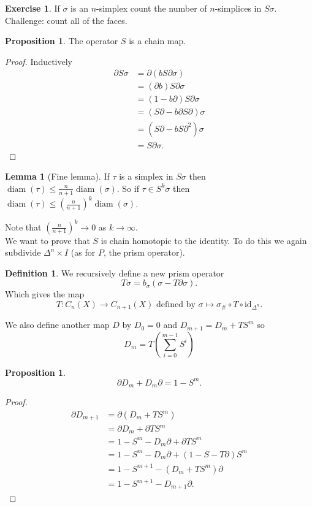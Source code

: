 \documentclass[12pt]{article}
\theoremstyle{definition}
\newtheorem{lem}[thm]{Lemma}
\newtheorem{prop}[thm]{Proposition}
\theoremstyle{definition}
\newtheorem{defn}[thm]{Definition}
\newtheorem*{exer}{Exercise}
\DeclareMathOperator{\diam}{diam}
\begin{document}
\begin{exer}
If $\sigma$ is an $n$-simplex count the number of $n$-simplices in $S\sigma$.
Challenge: count all of the faces.
\end{exer}

\begin{prop}
The operator $S$ is a chain map.
\end{prop}
\begin{proof}
Inductively
\begin{align*}
\partial S \sigma &= \partial(bS\partial \sigma)\\
&= (\partial b) S\partial \sigma\\
&= (1 - b \partial) S\partial \sigma\\
&= (S\partial - b \partial S \partial) \sigma\\
&= (S\partial - b S \partial^2) \sigma\\
&= S\partial \sigma.
\end{align*}
\end{proof}

\begin{lem}[Fine lemma]
If $\tau$ is a simplex in $S \sigma$ then $\diam(\tau)  \le \frac{n}{n+1}\diam (\sigma)$.
So if $\tau \in S^k \sigma$ then $\diam(\tau) \le \left(\frac{n}{n+1}\right)^k \diam(\sigma)$.
\end{lem}
Note that $\left(\frac{n}{n+1}\right)^k \to 0$ as $k \to \infty$.\\

We want to prove that $S$ is chain homotopic to the identity.
To do this we again subdivide $\Delta^n \times I$ (as for $P$, the prism operator).

\begin{defn}
We recursively define a new prism operator
\[
T\sigma = b_\sigma(\sigma - T\partial \sigma).
\]
Which gives the map
\[
T\colon C_n(X) \to C_{n+1}(X) \text{ defined by } \sigma \mapsto \sigma_\# \circ T \circ \text{id}_{\Delta^n}.
\]

We also define another map $D$ by $D_0 = 0$ and $D_{m+1} = D_m + TS^m$ so
\[
D_m = T\left( \sum_{i=0}^{m-1} S^i\right)
\]
\end{defn}

\begin{prop}
\[
\partial D_m  + D_m \partial = 1 - S^m.
\]
\end{prop}
\begin{proof}
\begin{align*}
\partial D_{m+1} &= \partial (D_m +  TS^m)\\
&= \partial D_m + \partial TS^m \\
&= 1 - S^m -  D_m\partial  + \partial TS^m \\
&= 1 - S^m -  D_m\partial  + (1 - S - T\partial)S^m \\
&= 1 - S^{m+1} - (D_m +  TS^m)\partial \\
&= 1 - S^{m+1} - D_{m+1}\partial.
\end{align*}
\end{proof}
\end{document}
